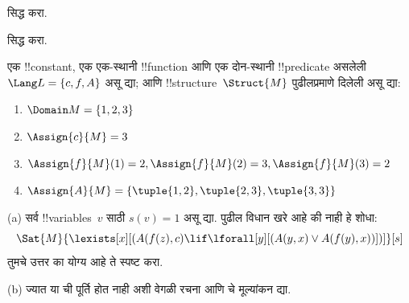 \documentclass[../../../include/open-logic-section]{subfiles}
\begin{document}

\begin{prob}
   सिद्ध करा.
\end{prob}
\tagendprob


\begin{prob}
   सिद्ध करा.
\end{prob}
\tagendprob

\begin{prob}
एक !!{constant}, एक एक-स्थानी !!{function} आणि एक दोन-स्थानी
!!{predicate} असलेली $\Lang L = \{c, f, A\}$ असू द्या; आणि
!!{structure}~$\Struct{M}$ पुढीलप्रमाणे दिलेली असू द्या:
\begin{enumerate}
\item $\Domain M = \{1, 2, 3\}$
\item $\Assign{c}{M} = 3$
\item $\Assign{f}{M}(1) = 2, \Assign{f}{M}(2) = 3, \Assign{f}{M}(3) = 2$
\item $\Assign{A}{M} = \{\tuple{1, 2}, \tuple{2, 3}, \tuple{3, 3}\}$
\end{enumerate}
(a) सर्व !!{variable}s~$v$ साठी $s(v) = 1$ असू द्या. पुढील विधान
खरे आहे की नाही हे शोधा:
\[
\Sat{M}{\lexists[x][(A(f(z), c) \lif \lforall[y][(A(y, x) \lor A(f(y),
      x))])]}[s]
\]
तुमचे उत्तर का योग्य आहे ते स्पष्ट करा.

(b) ज्यात या ची पूर्ति होत नाही अशी वेगळी रचना आणि
चे मूल्यांकन द्या.
\end{prob}
\end{document}
